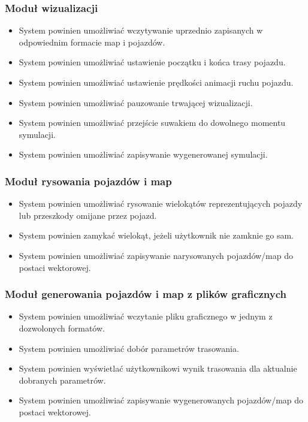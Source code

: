 \documentclass{article}
\begin{document}
\subsubsection{Moduł wizualizacji}
\begin{itemize}
  \item System powinien umożliwiać wczytywanie uprzednio zapisanych w odpowiednim formacie map i pojazdów.
  \item System powinien umożliwiać ustawienie początku i końca trasy pojazdu.
  \item System powinien umożliwiać ustawienie prędkości animacji ruchu pojazdu.
  \item System powinien umożliwiać pauzowanie trwającej wizualizacji.
  \item System powinien umożliwiać przejście suwakiem do dowolnego momentu symulacji.
  \item System powinien umożliwiać zapisywanie wygenerowanej symulacji.
\end{itemize}

\subsubsection{Moduł rysowania pojazdów i map}
\begin{itemize}
  \item System powinien umożliwiać rysowanie wielokątów reprezentujących pojazdy lub przeszkody omijane przez pojazd.
  \item System powinien zamykać wielokąt, jeżeli użytkownik nie zamknie go sam.
  \item System powinien umożliwiać zapisywanie narysowanych pojazdów/map do postaci wektorowej.
\end{itemize}

\subsubsection{Moduł generowania pojazdów i map z plików graficznych}
\begin{itemize}
  \item System powinien umożliwiać wczytanie pliku graficznego w jednym z dozwolonych formatów.
  \item System powinien umożliwiać dobór parametrów trasowania.
  \item System powinien wyświetlać użytkownikowi wynik trasowania dla aktualnie dobranych parametrów.
  \item System powinien umożliwiać zapisywanie wygenerowanych pojazdów/map do postaci wektorowej.
\end{itemize}
\end{document}
